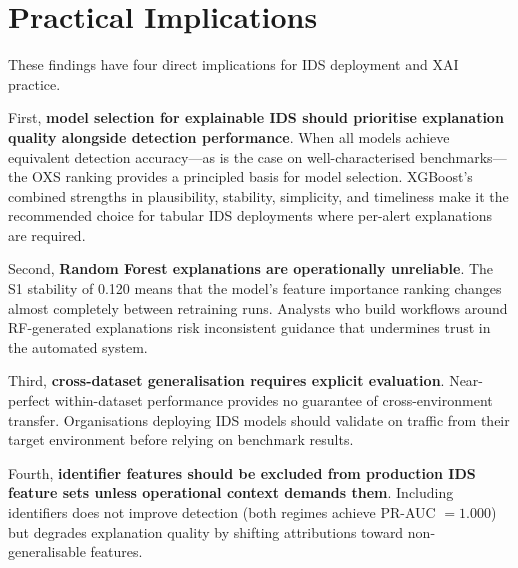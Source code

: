 \documentclass[12pt,a4paper]{report}
\begin{document}
\section{Practical Implications}
\label{sec:practical}

These findings have four direct implications for IDS deployment and XAI practice.

First, \textbf{model selection for explainable IDS should prioritise explanation quality alongside detection performance}. When all models achieve equivalent detection accuracy---as is the case on well-characterised benchmarks---the OXS ranking provides a principled basis for model selection. XGBoost's combined strengths in plausibility, stability, simplicity, and timeliness make it the recommended choice for tabular IDS deployments where per-alert explanations are required.

Second, \textbf{Random Forest explanations are operationally unreliable}. The S1 stability of 0.120 means that the model's feature importance ranking changes almost completely between retraining runs. Analysts who build workflows around RF-generated explanations risk inconsistent guidance that undermines trust in the automated system.

Third, \textbf{cross-dataset generalisation requires explicit evaluation}. Near-perfect within-dataset performance provides no guarantee of cross-environment transfer. Organisations deploying IDS models should validate on traffic from their target environment before relying on benchmark results.

Fourth, \textbf{identifier features should be excluded from production IDS feature sets unless operational context demands them}. Including identifiers does not improve detection (both regimes achieve PR-AUC $= 1.000$) but degrades explanation quality by shifting attributions toward non-generalisable features.

\begin{center}
\end{center}
\end{document}
